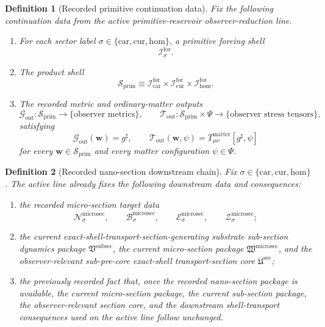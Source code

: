 \documentclass[11pt]{article}
\newcommand{\CompletedMetric}{g^{\sharp}}
\newcommand{\MatterSpace}{\Psi}
\newcommand{\Car}{\mathrm{car}}
\newcommand{\Cur}{\mathrm{cur}}
\newcommand{\Hom}{\mathrm{hom}}
\newcommand{\ForSpace}[1]{\mathcal I_{#1}^{\mathrm{for}}}
\newcommand{\PrimShell}{\mathcal S_{\mathrm{prim}}}
\newcommand{\MetricOut}{\mathscr G_{\mathrm{out}}}
\newcommand{\MatterOut}{\mathscr T_{\mathrm{out}}}
\newcommand{\SubSectionPackage}{\mathfrak V^{\mathrm{subsec}}}
\newcommand{\MicroSectionPackage}{\mathfrak W^{\mathrm{microsec}}}
\newcommand{\MicroSectionSpace}[1]{\mathcal N_{#1}^{\mathrm{microsec}}}
\newcommand{\MicroSectionBody}[1]{\mathcal B_{#1}^{\mathrm{microsec}}}
\newcommand{\MicroSectionFunctional}[1]{\mathscr E_{#1}^{\mathrm{microsec}}}
\newcommand{\MicroSectionShell}[1]{\mathcal Z_{#1}^{\mathrm{microsec}}}
\newcommand{\SubPreSectionCore}{\mathfrak U^{\mathrm{sec}}}
\newtheorem{definition}{Definition}
\begin{document}
\begin{definition}[Recorded primitive continuation data]
\label{def:fixed}
Fix the following continuation data from the active primitive-reservoir observer-reduction line.
\begin{enumerate}
    \item For each sector label \(\sigma\in\{\Car,\Cur,\Hom\}\), a primitive forcing shell
    \[
    \ForSpace{\sigma}.
    \]
    \item The product shell
    \[
    \PrimShell
    \equiv
    \ForSpace{\Car}\times \ForSpace{\Cur}\times \ForSpace{\Hom}.
    \]
    \item The recorded metric and ordinary-matter outputs
    \[
    \MetricOut:\PrimShell\to\{\text{observer metrics}\},
    \qquad
    \MatterOut:\PrimShell\times\MatterSpace\to\{\text{observer stress tensors}\},
    \]
    satisfying
    \begin{equation}
    \MetricOut(\mathbf w)=\CompletedMetric,
    \qquad
    \MatterOut(\mathbf w,\psi)
    =
    T_{\mu\nu}^{\mathrm{matter}}[\CompletedMetric,\psi]
    \label{eq:fixedoutputs}
    \end{equation}
    for every \(\mathbf w\in\PrimShell\) and every matter configuration \(\psi\in\MatterSpace\).
\end{enumerate}
\end{definition}

\begin{definition}[Recorded nano-section downstream chain]
\label{def:downstream}
Fix \(\sigma\in\{\Car,\Cur,\Hom\}\). The active line already fixes the following downstream data and consequences:
\begin{enumerate}
    \item the recorded micro-section target data
    \[
    \MicroSectionSpace{\sigma},\qquad
    \MicroSectionBody{\sigma},\qquad
    \MicroSectionFunctional{\sigma},\qquad
    \MicroSectionShell{\sigma};
    \]
    \item the current exact-shell-transport-section-generating substrate sub-section dynamics package \(\SubSectionPackage\), the current micro-section package \(\MicroSectionPackage\), and the observer-relevant sub-pre-core exact-shell transport-section core \(\SubPreSectionCore\);
    \item the previously recorded fact that, once the recorded nano-section package is available, the current micro-section package, the current sub-section package, the observer-relevant section core, and the downstream shell-transport consequences used on the active line follow unchanged.
\end{enumerate}
\end{definition}
\end{document}
